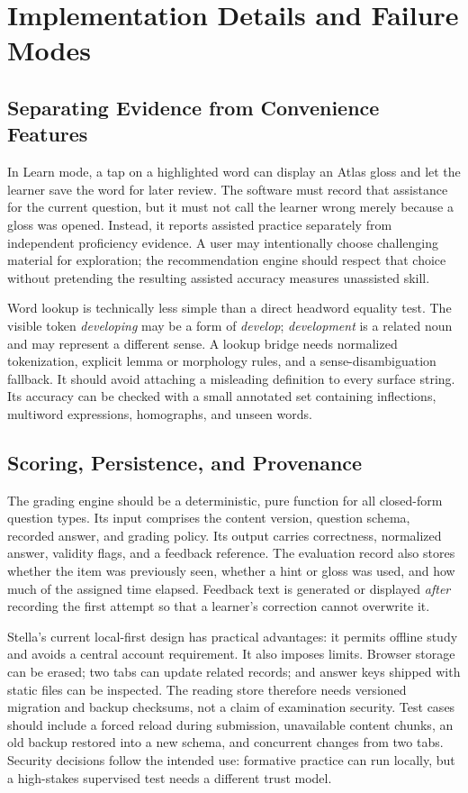 \documentclass[conference,10pt]{IEEEtran}
\begin{document}
\section{Implementation Details and Failure Modes}
\subsection{Separating Evidence from Convenience Features}
In Learn mode, a tap on a highlighted word can display an Atlas gloss and let the learner save the word for later review. The software must record that assistance for the current question, but it must not call the learner wrong merely because a gloss was opened. Instead, it reports assisted practice separately from independent proficiency evidence. A user may intentionally choose challenging material for exploration; the recommendation engine should respect that choice without pretending the resulting assisted accuracy measures unassisted skill.

Word lookup is technically less simple than a direct headword equality test. The visible token \emph{developing} may be a form of \emph{develop}; \emph{development} is a related noun and may represent a different sense. A lookup bridge needs normalized tokenization, explicit lemma or morphology rules, and a sense-disambiguation fallback. It should avoid attaching a misleading definition to every surface string. Its accuracy can be checked with a small annotated set containing inflections, multiword expressions, homographs, and unseen words.

\subsection{Scoring, Persistence, and Provenance}
The grading engine should be a deterministic, pure function for all closed-form question types. Its input comprises the content version, question schema, recorded answer, and grading policy. Its output carries correctness, normalized answer, validity flags, and a feedback reference. The evaluation record also stores whether the item was previously seen, whether a hint or gloss was used, and how much of the assigned time elapsed. Feedback text is generated or displayed \emph{after} recording the first attempt so that a learner's correction cannot overwrite it.

Stella's current local-first design has practical advantages: it permits offline study and avoids a central account requirement. It also imposes limits. Browser storage can be erased; two tabs can update related records; and answer keys shipped with static files can be inspected. The reading store therefore needs versioned migration and backup checksums, not a claim of examination security. Test cases should include a forced reload during submission, unavailable content chunks, an old backup restored into a new schema, and concurrent changes from two tabs. Security decisions follow the intended use: formative practice can run locally, but a high-stakes supervised test needs a different trust model.
\end{document}
